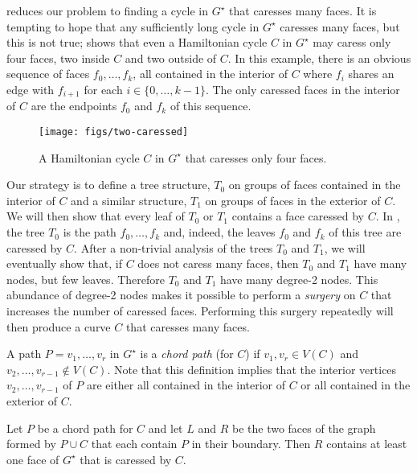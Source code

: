 \documentclass{patmorin}
\newcommand{\dual}[1]{{#1}^\star}
\begin{document}
 reduces our problem to finding a cycle in
$\dual{G}$ that caresses many faces.  It is tempting to hope that
any sufficiently long cycle in $\dual{G}$ caresses many faces, but
this is not true;  shows that even a Hamiltonian
cycle $C$ in $\dual{G}$ may caress only four faces, two inside $C$ and
two outside of $C$.  In this example, there is an obvious sequence of
faces $f_0,\ldots,f_k$, all contained in the interior of $C$ where $f_i$
shares an edge with $f_{i+1}$ for each $i\in\{0,\ldots,k-1\}$.  The only
caressed faces in the interior of $C$ are the endpoints $f_0$ and $f_k$ of this sequence.

\begin{figure}
   \begin{center}
       \texttt{[image: figs/two-caressed]}
   \end{center}
   \caption{A Hamiltonian cycle $C$ in $\dual{G}$ that caresses only four faces.}
\end{figure}

Our strategy is to define a tree structure, $T_0$ on groups of faces
contained in the interior of $C$ and a similar structure, $T_1$ on groups
of faces in the exterior of $C$.  We will then show that every leaf of
$T_0$ or $T_1$ contains a face caressed by $C$. In ,
the tree $T_0$ is the path $f_0,\ldots,f_k$ and, indeed, the leaves $f_0$
and $f_k$ of this tree are caressed by $C$.  After a non-trivial analysis of the trees $T_0$ and $T_1$, we will eventually show that,
if $C$ does not caress many faces, then $T_0$ and $T_1$ have many nodes,
but few leaves.  Therefore $T_0$ and $T_1$ have many degree-2 nodes.
This abundance of degree-2 nodes makes it possible to perform a \emph{surgery}
on $C$ that increases the number of caressed faces.  Performing this
surgery repeatedly will then produce a curve $C$ that caresses many faces.

A path $P=v_1,\ldots,v_r$ in $\dual{G}$ is a \emph{chord
path} (for $C$) if $v_1,v_r\in V(C)$ and $v_2,\ldots,v_{r-1}\not\in
V(C)$.  Note that this definition implies that the interior vertices
$v_2,\ldots,v_{r-1}$ of $P$ are either all contained in the interior of
$C$ or all contained in the exterior of $C$.

\begin{lem}
   Let $P$ be a chord path for $C$ and let $L$ and $R$ be the two faces
   of the graph formed by $P\cup C$ that each contain $P$ in their boundary. Then $R$
   contains at least one face of $\dual{G}$ that is caressed by $C$.
\end{lem}
\end{document}
